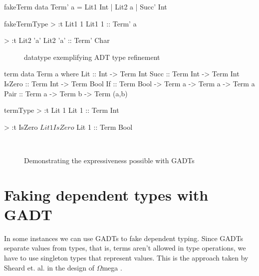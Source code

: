 \begin{SaveVerbatim}{fakeTerm}
data Term' a = Lit1 Int
             | Lit2 a
             | Succ' Int

\end{SaveVerbatim}

\begin{SaveVerbatim}{fakeTermType}
> :t Lit1 1
Lit1 1 :: Term' a

> :t Lit2 'a'
Lit2 'a' :: Term' Char
\end{SaveVerbatim}

\begin{figure}
  \begin{subfigure}[b]{.5\linewidth}
    \caption{}
  \end{subfigure}
  \begin{subfigure}[b]{.5\linewidth}
    \caption{}
  \end{subfigure}
  \caption{datatype exemplifying ADT type refinement}
  \label{fig:fakeTerm}
\end{figure}


\begin{SaveVerbatim}{term}
data Term a where
  Lit    :: Int -> Term Int
  Succ   :: Term Int -> Term Int
  IsZero :: Term Int -> Term Bool
  If     :: Term Bool -> Term a -> Term a -> Term a
  Pair   :: Term a -> Term b -> Term (a,b)
\end{SaveVerbatim}

\begin{SaveVerbatim}{termType}
> :t Lit 1
Lit 1 :: Term Int

> :t IsZero $ Lit 1
IsZero $ Lit 1 :: Term Bool
\end{SaveVerbatim}


\begin{figure}
  \centering
  \begin{subfigure}{.5\linewidth}
    \caption{}
  \end{subfigure}
  \\
  \begin{subfigure}{.5\linewidth}
    \caption{}
  \end{subfigure}
  \caption{Demonstrating the expressiveness possible with GADTs}
  \label{fig:term}
\end{figure}

\section{Faking dependent types with GADT}
In some instances we can use GADTs to fake dependent typing. Since GADTs separate values from types, that is, terms aren't allowed in type operations, we have to use singleton types that represent values. This is the approach taken by Sheard et. al. in the design of $\Omega$mega \cite{gadts}.

